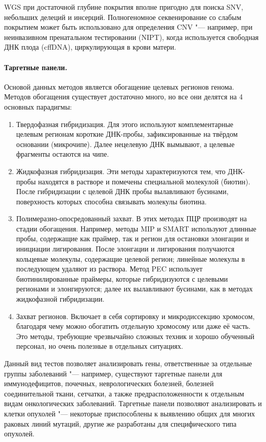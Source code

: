 \documentclass[a4paper,12pt]{article}
\begin{document}
WGS при достаточной глубине покрытия вполне пригодно для поиска SNV, небольших делеций и инсерций.
Полногеномное секвенирование со слабым покрытием может быть использовано для определения CNV "--- например, при неинвазивном пренатальном тестировании (NIPT), когда используется свободная ДНК плода (cffDNA), циркулирующая в крови матери\cite{yu}.

\paragraph{Таргетные панели.}
Основой данных методов является обогащение целевых регионов генома.
Методов обогащения существует достаточно много, но все они делятся на 4 основных парадигмы\cite{teer}:

\begin{enumerate}
\item Твердофазная гибридизация.
Для этого используют комплементарные целевым регионам короткие ДНК-пробы, зафиксированные на твёрдом основании (микрочипе).
Далее нецелевую ДНК вымывают, а целевые фрагменты остаются на чипе.
\item Жидкофазная гибридизация.
Эти методы характеризуются тем, что ДНК-пробы находятся в растворе и помечены специальной молекулой (биотин).
После гибридизации с целевой ДНК пробы вылавливают бусинами, поверхность которых способна связывать молекулы биотина.
\item Полимеразно-опосредованный захват.
В этих методах ПЦР производят на стадии обогащения.
Например, методы MIP и SMART используют длинные пробы, содержащие как праймер, так и регион для остановки элонгации и инициации лигирования.
После элонгации и лигирования получаются кольцевые молекулы, содержащие целевой регион;
линейные молекулы в последующем удаляют из раствора.
Метод PEC использует биотинилированные праймеры, которые гибридизуются с целевыми регионами и элонгируются;
далее их вылавливают бусинами, как в методах жидкофазной гибридизации.
\item Захват регионов.
Включает в себя сортировку и микродиссекцию хромосом, благодаря чему можно обогатить отдельную хромосому или даже её часть.
Это методы, требующие чрезвычайно сложных техник и хорошо обученный персонал, но очень полезные в отдельных ситуациях.
\end{enumerate}

Данный вид тестов позволяет анализировать гены, ответственные за отдельные группы заболеваний "--- например, существуют таргетные панели для иммунодефицитов, почечных, неврологических болезней, болезней соединительной ткани, сетчатки, а также предрасположенности к отдельным видам онкологических заболеваний.
Таргетные панели позволяют анализировать и клетки опухолей "--- некоторые приспособлены к выявлению общих для многих раковых линий мутаций, другие же разработаны для специфического типа опухолей\cite{yohe}.
\end{document}
